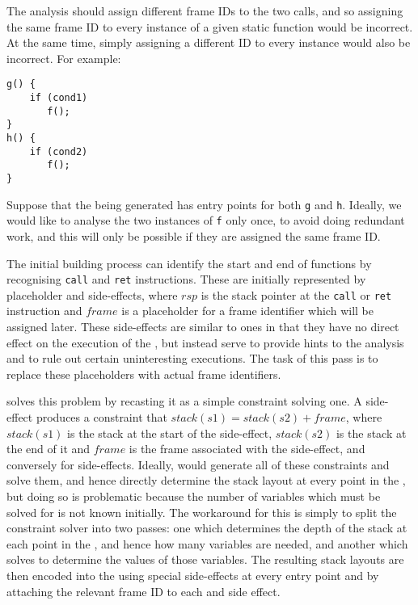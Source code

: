 The analysis should assign different frame IDs to the two calls, and
so assigning the same frame ID to every instance of a given static
function would be incorrect.  At the same time, simply assigning a
different ID to every instance would also be incorrect.  For example:

\begin{verbatim}
g() {
    if (cond1)
       f();
}
h() {
    if (cond2)
       f();
}
\end{verbatim}


Suppose that the {\StateMachine} being generated has entry points for
both \verb|g| and \verb|h|.  Ideally, we would like to analyse the two
instances of \verb|f| only once, to avoid doing redundant work, and
this will only be possible if they are assigned the same frame ID.

The initial {\StateMachine} building process can identify the start
and end of functions by recognising \verb|call| and \verb|ret|
instructions.  These are initially represented by placeholder
 and  side-effects, where $rsp$ is the stack pointer at the
\verb|call| or \verb|ret| instruction and $frame$ is a placeholder for
a frame identifier which will be assigned later.  These side-effects
are similar to  ones in that they have no direct effect
on the execution of the {\StateMachine}, but instead serve to provide
hints to the analysis and to rule out certain uninteresting
executions.  The task of this pass is to replace these placeholders
with actual frame identifiers.

{\Technique} solves this problem by recasting it as a simple
constraint solving one.  A  side-effect
produces a constraint that $stack(s1) = stack(s2) + frame$, where
$stack(s1)$ is the stack at the start of the side-effect, $stack(s2)$
is the stack at the end of it and $frame$ is the frame associated with
the side-effect, and conversely for  side-effects.
Ideally, {\Technique} would generate all of these constraints and
solve them, and hence directly determine the stack layout at every
point in the {\StateMachine}, but doing so is problematic because the
number of variables which must be solved for is not known initially.
The workaround for this is simply to split the constraint solver into
two passes: one which determines the depth of the stack at each point
in the \StateMachine, and hence how many variables are needed, and
another which solves to determine the values of those variables.  The
resulting stack layouts are then encoded into the {\StateMachine}
using special  side-effects at every entry point and by attaching the relevant frame ID
to each  and  side
effect.

